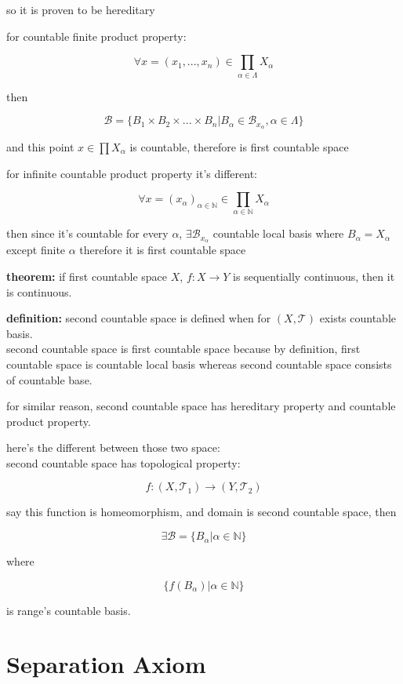 \documentclass{article}
\begin{document}
so it is proven to be hereditary

for countable finite product property:

\[
\forall x=(x_1,...,x_n)\in \prod_{\alpha\in \Lambda}X_\alpha 
\]

then 

\[
\mathcal{B}=\{B_1\times B_2 \times ... \times B_n|B_\alpha \in \mathcal{B}_{x_\alpha}, \alpha\in \Lambda\}
\]

and this point $x\in\prod X_\alpha$ is countable, therefore is first countable space

for infinite countable product property it's different:

\[
\forall x=(x_\alpha)_{\alpha \in \mathbb{N}}\in \prod_{\alpha\in \mathbb{N}}X_\alpha 
\]

then since it's countable for every $\alpha$, $\exists \mathcal{B}_{x_\alpha}$ countable local basis where $B_\alpha=X_\alpha$ except finite $\alpha$ therefore it is first countable space

\textbf{theorem:} if first countable space $X$, $f:X\rightarrow Y$ is sequentially continuous, then it is continuous.

\textbf{definition: } second countable space is defined when for $(X,\mathcal{T})$ exists countable basis. 
\\


second countable space is first countable space because by definition, first countable space is countable local basis whereas second countable space consists of countable base.

for similar reason, second countable space has hereditary property and countable product property. 

here's the different between those two space:
\\


second countable space has topological property:

\[
f:(X,\mathcal{T}_1)\rightarrow (Y,\mathcal{T}_2)
\]

say this function is homeomorphism, and domain is second countable space, then

\[
\exists \mathcal{B}=\{B_\alpha|\alpha\in \mathbb{N}\}
\]

where

\[
\{f(B_\alpha)|\alpha\in\mathbb{N}\}
\]

is range's countable basis.

\section*{Separation Axiom}
\end{document}
